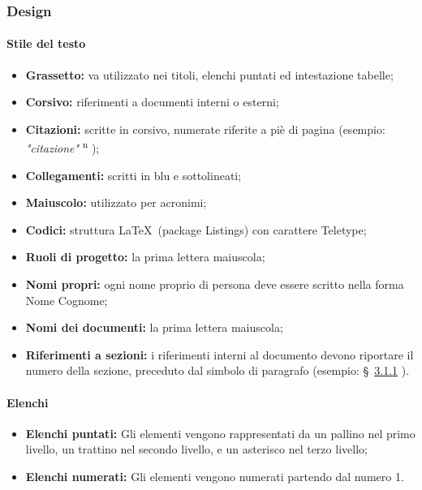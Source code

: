 \documentclass[11pt,a4paper]{article}
\begin{document}
	\subsubsection{Design}
	
	\paragraph{Stile del testo}
	
	\noindent   
	\begin{itemize}
		\item \textbf{Grassetto:} va utilizzato nei titoli, elenchi puntati ed intestazione tabelle;
		\item \textbf{Corsivo:} riferimenti a documenti interni o esterni;
		\item \textbf{Citazioni:} scritte in corsivo, numerate riferite a piè di pagina (esempio: \textit{"citazione"} \textsuperscript{n} );
		\item \textbf{Collegamenti:} scritti in blu e sottolineati;
		\item \textbf{Maiuscolo:} utilizzato per acronimi;
		\item \textbf{Codici:} struttura \LaTeX\ (package Listings) con carattere Teletype;
		\item \textbf{Ruoli di progetto:} la prima lettera maiuscola;
		\item \textbf{Nomi propri:} ogni nome proprio di persona deve essere scritto nella forma Nome Cognome;
		\item \textbf{Nomi dei documenti:} la prima lettera maiuscola;
		\item \textbf{Riferimenti a sezioni:} i riferimenti interni al documento devono riportare il numero della sezione, preceduto dal simbolo di paragrafo (esempio: \S\ \hyperref[c]{3.1.1} ).
		
	\end{itemize}


	\paragraph{Elenchi}
	\begin{itemize}
	\item \textbf{Elenchi puntati:} Gli elementi vengono rappresentati da un pallino nel primo livello, un trattino nel secondo livello, e un asterisco nel terzo livello; 
	\item \textbf{Elenchi numerati:} Gli elementi vengono numerati partendo dal numero 1.
	\end{itemize}
\end{document}
